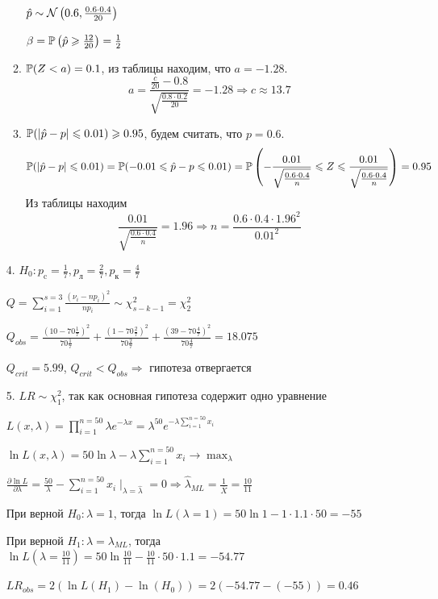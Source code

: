 \begin{enumerate}
\begin{enumerate}
$\hat p \sim \cN\left(0.6, \frac{0.6\cdot0.4}{20} \right)$

$\beta = \P\left( \hat p \geq \frac{12}{20} \right) = \frac{1}{2}$
\item $\P(Z < a) =0.1$, из таблицы находим, что $a=-1.28$.
\[
a = \frac{\frac{c}{20} - 0.8}{\sqrt{\frac{0.8\cdot0.2}{20}}} = -1.28 \Rightarrow c \approx 13.7
\]
\item $\P(\vert \hat p - p \vert \leq 0.01) \geq 0.95$, будем считать, что $p=0.6$.
\[
\P(\vert \hat p - p \vert \leq 0.01) = \P(-0.01 \leq \hat p - p \leq 0.01) = \P\left(-\frac{0.01}{\sqrt{\frac{0.6\cdot0.4}{n}}} \leq Z \leq \frac{0.01}{\sqrt{\frac{0.6\cdot0.4}{n}}} \right) =0.95
\]
Из таблицы находим
\[
\frac{0.01}{\sqrt{\frac{0.6\cdot0.4}{n}}} = 1.96 \Rightarrow n = \frac{0.6\cdot0.4\cdot1.96^2}{0.01^2}
\]
\end{enumerate}

\item[4.] $H_0: p_{\text{c}} = \frac{1}{7}, p_{\text{л}} = \frac{2}{7}, p_{\text{к}} = \frac{4}{7}$

$Q = \sum_{i=1}^{s=3} \frac{(\nu_i - np_i)^2}{np_i} \sim \chi^2_{s-k-1} = \chi^2_2$

$Q_{obs} = \frac{\left(10-70\frac{1}{7}\right)^2}{70\frac{1}{7}} + \frac{\left(1-70\frac{2}{7}\right)^2}{70\frac{2}{7}} + \frac{\left(39-70\frac{4}{7}\right)^2}{70\frac{4}{7}} = 18.075$

$Q_{crit} = 5.99$, $Q_{crit} < Q_{obs} \Rightarrow$ гипотеза отвергается

\item[5.] $LR \sim \chi^2_1$, так как основная гипотеза содержит одно уравнение

$L(x, \lambda) = \prod_{i=1}^{n=50} \lambda e^{-\lambda x} = \lambda^{50} e^{-\lambda \sum_{i=1}^{n=50} x_i}$

$\ln L (x, \lambda) = 50\ln\lambda - \lambda \sum_{i=1}^{n=50} x_i \to \max_\lambda$

$\frac{\partial \ln L}{\partial \lambda} = \frac{50}{\lambda} - \sum_{i=1}^{n=50} x_i \mid_{\lambda=\hat{\lambda}} = 0 \Rightarrow \hat{\lambda}_{ML} = \frac{1}{\overline{X}} = \frac{10}{11}$

При верной $H_0:  \lambda=1$, тогда $\ln L (\lambda=1) = 50 \ln 1 - 1 \cdot 1.1 \cdot 50 = -55$

При верной $H_1: \lambda=\lambda_{ML}$, тогда $\ln L \left(\lambda=\frac{10}{11}\right) = 50 \ln \frac{10}{11} - \frac{10}{11} \cdot 50 \cdot 1.1 = -54.77$

$LR_{obs} = 2(\ln L (H_1) - \ln(H_0)) = 2(-54.77- (-55)) = 0.46$


\end{enumerate}
